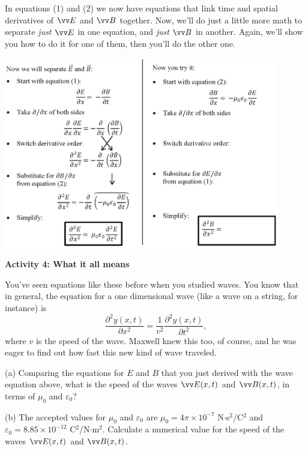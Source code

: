 In equations (1) and (2) we now have equations that link time and spatial derivatives of $\vv E$ and $\vv B$ together.  Now, we'll do just a little more math to separate \textit{just} $\vv E$ in one equation, and \textit{just} $\vv B$ in another.  Again, we'll show you how to do it for one of them, then you'll do the other one.
\vspace{-0.2in}

\begin{center}
    \includegraphics[width=0.9\textwidth]{deriving_em_waves/separate_E_and_B.eps} 
 \end{center}
\vspace{-0.2in}

\textbf{Activity 4: What it all means}

You've seen equations like these before when you studied waves.  You know that in general, the equation for a one dimensional wave (like a wave on a string, for instance) is
\begin{displaymath}
\frac{\partial^2y(x,t)}{\partial x^2}= \frac{1}{v^2} \frac{\partial^2y(x,t)}{\partial t^2},
\end{displaymath}
where $v$ is the speed of the wave.  Maxwell knew this too, of course, and he was eager to find out how fast this new kind of wave traveled.

(a) Comparing the equations for $E$ and $B$ that you just derived with the wave equation above, what is the speed of the waves $\vv E(x,t)$ and $\vv B(x,t)$, in terms of $\mu_0$ and $\varepsilon_0$?
\vspace{0.5in}

(b)  The accepted values for $\mu_0$ and $\varepsilon_0$ are $\mu_0=4\pi \times 10^{-7}$ N$\cdot$s$^2$/C$^2$ and 
$\varepsilon_0=8.85 \times 10^{-12}$ C$^2$/N$\cdot $m$^2$.  Calculate a numerical value for the speed of the waves 
$\vv E(x,t)$ and $\vv B(x,t)$.
\vspace{0.5in}

